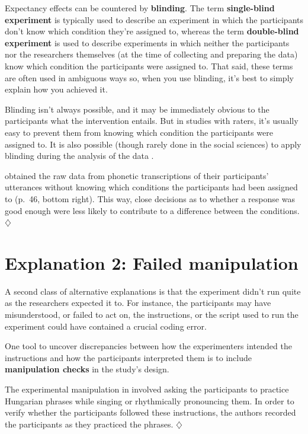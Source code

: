 \documentclass[a4paper]{tufte-book}\usepackage[]{graphicx}\usepackage[]{xcolor}
\newcommand{\term}[1]{\textbf{#1}}
\newcommand*{\parend}[1][$\diamondsuit$]{%
  \unskip\nobreak\hspace{1em plus 1fill}$\diamondsuit$%
}
\begin{document}
Expectancy effects can be countered by \term{blinding}.
The term \term{single-blind experiment} is typically used to describe
an experiment in which the participants don't know which condition
they're assigned to,
whereas the term \term{double-blind experiment} is used to describe experiments
in which neither the participants nor the researchers themselves
(at the time of collecting and preparing the data) know which condition
the participants were assigned to.
That said, these terms are often used in ambiguous ways
so, when you use blinding, it's best to simply explain how you achieved it.

Blinding isn't always possible, and it may be immediately obvious
to the participants what the intervention entails. But in studies
with raters, it's usually easy to prevent them from knowing
which condition the participants were assigned to.
It is also possible (though rarely done in the social sciences) 
to apply blinding during the analysis
of the data \citep{Dutilh2021}.

  \citet{Ludke2014} obtained the raw data from
  phonetic transcriptions of their participants'
  utterances without knowing which conditions the participants had been
  assigned to (p.~46, bottom right).
  This way, close decisions as to whether a response was good enough
  were less likely to contribute to a difference between the conditions.
\parend

\section{Explanation 2: Failed manipulation}
A second class of alternative explanations is that the experiment
didn't run quite as the researchers expected it to. For instance,
the participants may have misunderstood, or failed to act on, the instructions,
or the script used to run the experiment could have contained 
a crucial coding error.

One tool to uncover discrepancies between how the experimenters intended
the instructions and how the participants interpreted them is to 
include \term{manipulation checks} in the study's design.

  The experimental manipulation in \citet{Ludke2014} involved
  asking the participants to practice Hungarian phrases while
  singing or rhythmically pronouncing them.
  In order to verify whether the participants followed these instructions,
  the authors recorded the participants as they practiced the phrases.
\parend
\end{document}
